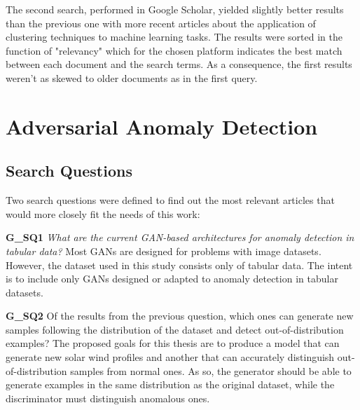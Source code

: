 The second search, performed in Google Scholar, yielded slightly better results than the previous one with more recent articles about the application of clustering techniques to machine learning tasks. The results were sorted in the function of "relevancy" which for the chosen platform indicates the best match between each document and the search terms. As a consequence, the first results weren't as skewed to older documents as in the first query.


\newpage %


\section{Adversarial Anomaly Detection}\label{sec:sota_anomaly_detection}

\subsection{Search Questions}\label{sec:gan_search_questions}
Two search questions were defined to find out the most relevant articles that would more closely fit the needs of this work:


\noindent\textbf{G\_SQ1} \textit{What are the current GAN-based architectures for anomaly detection in tabular data?} Most GANs are designed for problems with image datasets. However, the dataset used in this study consists only of tabular data. The intent is to include only GANs designed or adapted to anomaly detection in tabular datasets.

\noindent\textbf{G\_SQ2} Of the results from the previous question, which ones can generate new samples following the distribution of the dataset and detect out-of-distribution examples? The proposed goals for this thesis are to produce a model that can generate new solar wind profiles and another that can accurately distinguish out-of-distribution samples from normal ones. As so, the generator should be able to generate examples in the same distribution as the original dataset, while the discriminator must distinguish anomalous ones.

